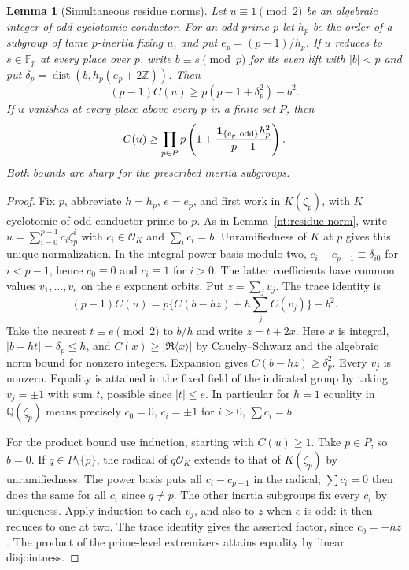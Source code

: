 \documentclass[11pt]{amsart}
\numberwithin{equation}{section}
\newtheorem{lemma}[theorem]{Lemma}
\theoremstyle{definition}
\theoremstyle{plain}
\newcommand{\QQ}{\mathbb Q}
\newcommand{\ZZ}{\mathbb Z}
\begin{document}
\begin{lemma}[Simultaneous residue norms]\label{rev:two-residue}
Let $u\equiv1\pmod2$ be an algebraic integer of odd cyclotomic
conductor. For an odd prime $p$ let $h_p$ be the order of a subgroup
of tame $p$-inertia fixing $u$, and put $e_p=(p-1)/h_p$.
If $u$ reduces to $s\in\mathbb F_p$ at every place over $p$, write
$b\equiv s\pmod p$ for its even lift with $|b|<p$ and put
$\delta_p=\operatorname{dist}(b,h_p(e_p+2\ZZ))$. Then
\[
 (p-1) C(u)\ge p(p-1+\delta_p^2)-b^2.
\]
If $u$ vanishes at every place above every $p$ in a finite set $P$, then
\[
 C(u)\ge\prod_{p\in P}p\left(1+
 \frac{\mathbf1_{\{e_p\ {\rm odd}\}}h_p^2}{p-1}\right).
\]
Both bounds are sharp for the prescribed inertia subgroups.
\end{lemma}
\begin{proof}
Fix $p$, abbreviate $h=h_p$, $e=e_p$, and first work in
$K(\zeta_p)$, with $K$ cyclotomic of odd conductor prime to $p$.
As in Lemma~\ref{nt:residue-norm}, write
$u=\sum_{i=0}^{p-1}c_i\zeta_p^i$ with $c_i\in\mathcal O_K$ and
$\sum_i c_i=b$. Unramifiedness of $K$ at $p$ gives this unique
normalization. In the integral power basis modulo two,
$c_i-c_{p-1}\equiv\delta_{i0}$ for $i<p-1$, hence $c_0\equiv0$
and $c_i\equiv1$ for $i>0$. The latter coefficients have common
values $v_1,\ldots,v_e$ on the $e$ exponent orbits. Put $z=\sum_jv_j$.
The trace identity is
\[
 (p-1)C(u)=p\{C(b-hz)+h\sum_j C(v_j)\}-b^2.
\]
Take the nearest $t\equiv e\pmod2$ to $b/h$ and write $z=t+2x$.
Here $x$ is integral, $|b-ht|=\delta_p\le h$, and
$C(x)\ge|\Re\langle x\rangle|$ by Cauchy--Schwarz and the algebraic
norm bound for nonzero integers. Expansion gives $C(b-hz)\ge\delta_p^2$.
Every $v_j$ is nonzero. Equality is attained in the fixed field of
the indicated group by taking $v_j=\pm1$ with sum $t$, possible since
$|t|\le e$. In particular for $h=1$ equality in $\QQ(\zeta_p)$
means precisely $c_0=0$, $c_i=\pm1$ for $i>0$, $\sum c_i=b$.

For the product bound use induction, starting with $C(u)\ge1$.
Take $p\in P$, so $b=0$. If $q\in P\setminus\{p\}$, the radical of
$q\mathcal O_K$ extends to that of $K(\zeta_p)$ by unramifiedness.
The power basis puts all $c_i-c_{p-1}$ in the radical; $\sum c_i=0$
then does the same for all $c_i$ since $q\ne p$. The other inertia
subgroups fix every $c_i$ by uniqueness. Apply induction to each
$v_j$, and also to $z$ when $e$ is odd: it then reduces to one at two.
The trace identity gives the asserted factor, since $c_0=-hz$.
The product of the prime-level extremizers attains equality by linear
disjointness.


\end{proof}
\end{document}
